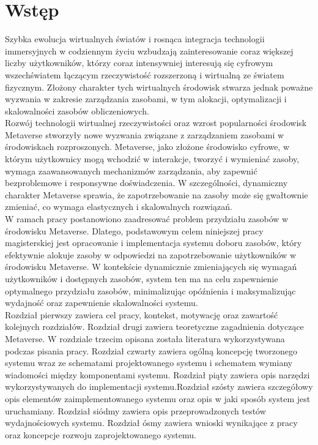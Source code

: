 \chapter{Wstęp}

Szybka ewolucja wirtualnych światów i rosnąca integracja technologii immersyjnych w codziennym życiu wzbudzają zainteresowanie coraz większej liczby użytkowników, którzy coraz intensywniej interesują się cyfrowym wszechświatem łączącym rzeczywistość rozszerzoną i wirtualną ze światem fizycznym. Złożony charakter tych wirtualnych środowisk stwarza jednak poważne wyzwania w zakresie zarządzania zasobami, w tym alokacji, optymalizacji i skalowalności zasobów obliczeniowych. \\

Rozwój technologii wirtualnej rzeczywistości oraz wzrost popularności środowisk Metaverse stworzyły nowe wyzwania związane z zarządzaniem zasobami w środowiskach rozproszonych. Metaverse, jako złożone środowisko cyfrowe, w którym użytkownicy mogą wchodzić w interakcje, tworzyć i wymieniać zasoby, wymaga zaawansowanych mechanizmów zarządzania, aby zapewnić bezproblemowe i responsywne doświadczenia. W szczególności, dynamiczny charakter Metaverse sprawia, że zapotrzebowanie na zasoby może się gwałtownie zmieniać, co wymaga elastycznych i skalowalnych rozwiązań.\\

W ramach pracy postanowiono zaadresować problem przydziału zasobów w środowisku Metaverse. Dlatego, podstawowym celem niniejszej pracy magisterskiej jest opracowanie i implementacja systemu doboru zasobów, który efektywnie alokuje zasoby w odpowiedzi na zapotrzebowanie użytkowników w środowisku Metaverse. W kontekście dynamicznie zmieniających się wymagań użytkowników i dostępnych zasobów, system ten ma na celu zapewnienie optymalnego przydziału zasobów, minimalizując opóźnienia i maksymalizując wydajność oraz zapewnienie skalowalności systemu.\\

Rozdział pierwszy zawiera cel pracy, kontekst, motywację oraz zawartość kolejnych rozdziałów. Rozdział drugi zawiera teoretyczne zagadnienia dotyczące Metaverse. W rozdziale trzecim opisana została literatura wykorzystywana podczas pisania pracy. Rozdział czwarty zawiera ogólną koncepcję tworzonego systemu wraz ze schematami projektowanego systemu i schematem wymiany wiadomości między komponentami systemu. Rozdział piąty zawiera opis narzędzi wykorzystywanych do implementacji systemu.Rozdział szósty zawiera szczegółowy opis elementów zaimplementowanego systemu oraz opis  w jaki sposób system jest uruchamiany. Rozdział siódmy zawiera opis przeprowadzonych testów wydajnościowych systemu. Rozdział ósmy zawiera wnioski wynikające z pracy oraz koncepcje rozwoju zaprojektowanego systemu.